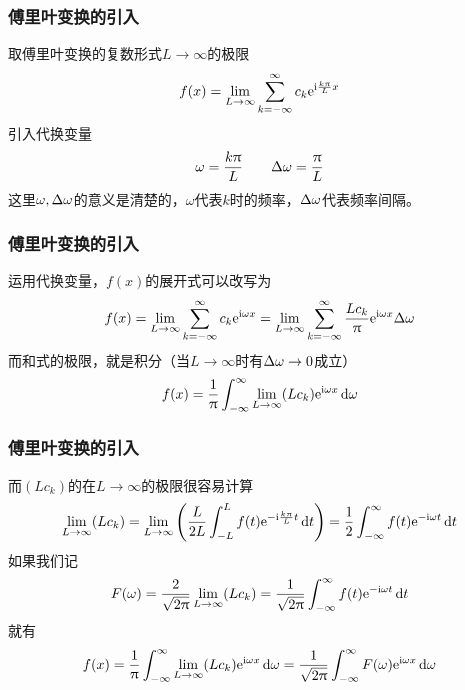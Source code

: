 \begin{frame}
    \frametitle{傅里叶变换的引入}
    取傅里叶变换的复数形式$L\to\infty$的极限
    \begin{equation}
        f(x)=\Lim[L\to\infty]\Sum[k=-\infty][\infty]{c_k\e^{\i\frac{k\pi}{L}x}}
    \end{equation}
    引入代换变量
    \begin{equation}
        \omega=\frac{k\uppi}{L}\qquad
        \Delta{\omega}=\frac{\uppi}{L}
    \end{equation}
    这里$\omega,\Delta{\omega}$的意义是清楚的，$\omega$代表$k$时的频率，$\Delta{\omega}$代表频率间隔。
\end{frame}

\begin{frame}
    \frametitle{傅里叶变换的引入}
    运用代换变量，$f(x)$的展开式可以改写为
    \begin{equation}
        f(x)=\Lim[L\to\infty]\Sum[k=-\infty][\infty]c_k\e^{\i\omega x}=\Lim[L\to\infty]\Sum[k=-\infty][\infty]\frac{Lc_k}{\pi}\e^{\i\omega x}\delt{\omega}
    \end{equation}
    而和式的极限，就是积分（当$L\to\infty$时有$\Delta\omega\to 0$成立）
    \begin{equation}
        f(x)=\frac{1}{\pi}\Int[-\infty][\infty]\Lim[L\to\infty](Lc_k)\e^{\i\omega x}\dd{\omega}
    \end{equation}
\end{frame}

\begin{frame}
    \frametitle{傅里叶变换的引入}
    而$(Lc_k)$的在$L\to\infty$的极限很容易计算
    \begin{equation}
        \Lim[L\to\infty](Lc_k)=\Lim[L\to\infty]\qty(\frac{L}{2L}
        \Int[-L][L]{f(t)\e^{-\i\frac{k\pi}{L}t}\dd{t}})=\frac{1}{2}\Int[-\infty][\infty]f(t)\e^{-\i\omega t}\dd{t}
    \end{equation}
    如果我们记
    \begin{equation}
        F(\omega)=\frac{2}{\sqrt{2\pi}}\Lim[L\to\infty](Lc_k)=\frac{1}{\sqrt{2\pi}}\Int[-\infty][\infty]f(t)\e^{-\i\omega t}\dd{t}
    \end{equation}
    就有
    \begin{equation}
        f(x)=\frac{1}{\pi}\Int[-\infty][\infty]\Lim[L\to\infty](Lc_k)\e^{\i\omega x}\dd{\omega}=\frac{1}{\sqrt{2\pi}}\Int[-\infty][\infty]F(\omega)\e^{\i\omega x}\dd{\omega}
    \end{equation}
\end{frame}

